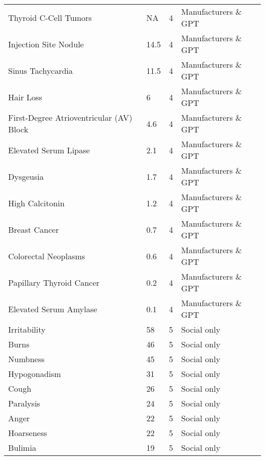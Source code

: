 \documentclass[referee,bst/sn-basic]{sn-jnl}%
\begin{document}
\begin{appendices}
\begin{longtable}{llll}
Thyroid C-Cell Tumors                    & NA        & 4    & Manufacturers \& GPT    \\
Injection Site Nodule                    & 14.5      & 4    & Manufacturers \& GPT    \\
Sinus Tachycardia                        & 11.5      & 4    & Manufacturers \& GPT    \\
Hair Loss                                & 6         & 4    & Manufacturers \& GPT    \\
First-Degree Atrioventricular (AV) Block & 4.6       & 4    & Manufacturers \& GPT    \\
Elevated Serum Lipase                    & 2.1       & 4    & Manufacturers \& GPT    \\
Dysgeusia                                & 1.7       & 4    & Manufacturers \& GPT    \\
High Calcitonin                          & 1.2       & 4    & Manufacturers \& GPT    \\
Breast Cancer                            & 0.7       & 4    & Manufacturers \& GPT    \\
Colorectal Neoplasms                     & 0.6       & 4    & Manufacturers \& GPT    \\
Papillary Thyroid Cancer                 & 0.2       & 4    & Manufacturers \& GPT    \\
Elevated Serum Amylase                   & 0.1       & 4    & Manufacturers \& GPT    \\
Irritability                             & 58        & 5    & Social only             \\
Burns                                    & 46        & 5    & Social only             \\
Numbness                                 & 45        & 5    & Social only             \\
Hypogonadism                             & 31        & 5    & Social only             \\
Cough                                    & 26        & 5    & Social only             \\
Paralysis                                & 24        & 5    & Social only             \\
Anger                                    & 22        & 5    & Social only             \\
Hoarseness                               & 22        & 5    & Social only             \\
Bulimia                                  & 19        & 5    & Social only             \\

\end{longtable}
\end{appendices}
\end{document}

